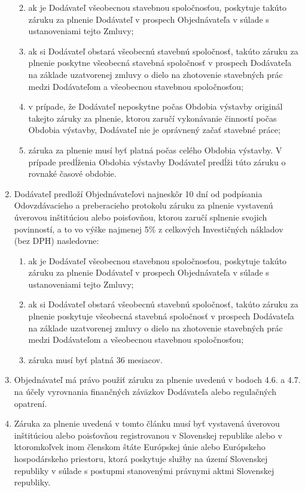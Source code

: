 \begin{multicols}{2}
\begin{enumerate}
  \begin{enumerate}
  \def\labelenumii{\arabic{enumii}.}
  \item
    ak je Dodávateľ všeobecnou stavebnou spoločnosťou, poskytuje takúto
    záruku za plnenie Dodávateľ v prospech Objednávateľa v súlade s
    ustanoveniami tejto Zmluvy;
  \item
    ak si Dodávateľ obstará všeobecnú stavebnú spoločnosť, takúto záruku
    za plnenie poskytne všeobecná stavebná spoločnosť v prospech
    Dodávateľa na základe uzatvorenej zmluvy o dielo na zhotovenie
    stavebných prác medzi Dodávateľom a všeobecnou stavebnou
    spoločnosťou;
  \item
    v prípade, že Dodávateľ neposkytne počas Obdobia výstavby originál
    takejto záruky za plnenie, ktorou zaručí vykonávanie činností počas
    Obdobia výstavby, Dodávateľ nie je oprávnený začať stavebné práce;
  \item
    záruka za plnenie musí byť platná počas celého Obdobia výstavby. V
    prípade predĺženia Obdobia výstavby Dodávateľ predĺži túto záruku o
    rovnaké časové obdobie.
  \end{enumerate}
\item
  Dodávateľ predloží Objednávateľovi najneskôr 10 dní od podpísania
  Odovzdávacieho a preberacieho protokolu záruku za plnenie vystavenú
  úverovou inštitúciou alebo poisťovňou, ktorou zaručí splnenie svojich
  povinností, a to vo výške najmenej 5\% z celkových Investičných
  nákladov (bez DPH) nasledovne:

  \begin{enumerate}
  \def\labelenumii{\arabic{enumii}.}
  \item
    ak je Dodávateľ všeobecnou stavebnou spoločnosťou, poskytuje takúto
    záruku za plnenie Dodávateľ v prospech Objednávateľa v súlade s
    ustanoveniami tejto Zmluvy;
  \item
    ak si Dodávateľ obstará všeobecnú stavebnú spoločnosť, takúto záruku
    za plnenie poskytuje všeobecná stavebná spoločnosť v prospech
    Dodávateľa na základe uzatvorenej zmluvy o dielo na zhotovenie
    stavebných prác medzi Dodávateľom a všeobecnou stavebnou
    spoločnosťou;
  \item
    záruka musí byť platná 36 mesiacov.
  \end{enumerate}
\item
  Objednávateľ má právo použiť záruku za plnenie uvedenú v bodoch 4.6. a
  4.7. na účely vyrovnania finančných záväzkov Dodávateľa alebo
  regulačných opatrení.
\item
  Záruka za plnenie uvedená v tomto článku musí byť vystavená úverovou
  inštitúciou alebo poisťovňou registrovanou v Slovenskej republike
  alebo v ktoromkoľvek inom členskom štáte Európskej únie alebo
  Európskeho hospodárskeho priestoru, ktorá poskytuje služby na území
  Slovenskej republiky v súlade s postupmi stanovenými právnymi aktmi
  Slovenskej republiky.
\end{enumerate}


\end{multicols}
